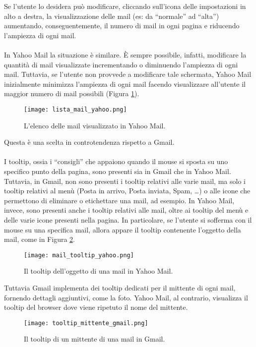		Se l'utente lo desidera può modificare, cliccando sull'icona delle impostazioni in alto a destra, la visualizzazione delle mail (es: da ``normale'' ad ``alta'') aumentando, conseguentemente, il numero di mail in ogni pagina e riducendo l'ampiezza di ogni mail.\\
		\\
		In Yahoo Mail la situazione è similare. È sempre possibile, infatti, modificare la quantità di mail visualizzate incrementando o diminuendo l'ampiezza di ogni mail. Tuttavia, se l'utente non provvede a modificare tale schermata, Yahoo Mail inizialmente minimizza l'ampiezza di ogni mail facendo visualizzare all'utente il maggior numero di mail possibili (Figura \ref{fig:lista_mail_yahoo}).
		\begin{figure}[h!]
			\begin{center}
				\texttt{[image: lista\_mail\_yahoo.png]}
			\end{center}
			\caption[Elenco mail in Yahoo Mail]{L'elenco delle mail visualizzato in Yahoo Mail.}
			\label{fig:lista_mail_yahoo}
		\end{figure}
		
		Questa è una scelta in controtendenza rispetto a Gmail.\\
		\\
		I tooltip, ossia i ``consigli'' che appaiono quando il mouse si sposta su uno specifico punto della pagina, sono presenti sia in Gmail che in Yahoo Mail. Tuttavia, in Gmail, non sono presenti i tooltip relativi alle varie mail, ma solo i tooltip relativi al menù (Posta in arrivo, Posta inviata, Spam, …) o alle icone che permettono di eliminare o etichettare una mail, ad esempio. In Yahoo Mail, invece, sono presenti anche i tooltip relativi alle mail, oltre ai tooltip del menù e delle varie icone presenti nella pagina. In particolare, se l'utente si sofferma con il mouse su una specifica mail, allora appare il tooltip contenente l'oggetto della mail, come in Figura \ref{fig:mail_tooltip_yahoo}.
		\begin{figure}[h!]
			\begin{center}
				\texttt{[image: mail\_tooltip\_yahoo.png]}
			\end{center}
			\caption[Tooltip di una mail in Yahoo Mail]{Il tooltip dell'oggetto di una mail in Yahoo Mail.}
			\label{fig:mail_tooltip_yahoo}
		\end{figure}
		
		Tuttavia Gmail implementa dei tooltip dedicati per il mittente di ogni mail, fornendo dettagli aggiuntivi, come la foto. Yahoo Mail, al contrario, visualizza il tooltip del browser dove viene ripetuto il nome del mittente.
		\begin{figure}[h!]
			\begin{center}
				\texttt{[image: tooltip\_mittente\_gmail.png]}
			\end{center}
			\caption[Tooltip di un mittente in Gmail]{Il tooltip di un mittente di una mail in Gmail.}
			\label{fig:tooltip_mittente_gmail}
		\end{figure}
		
